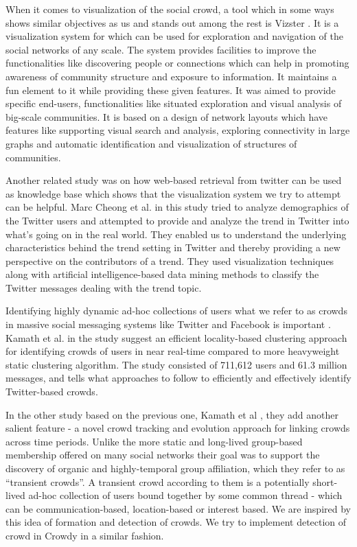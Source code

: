 \documentclass{sig-alternate}
\begin{document}
When it comes to visualization of the social crowd, a tool which in some ways
shows similar objectives as us and stands out among the rest is Vizster
\cite{Heer:2005}. It is a visualization system for which can be used for
exploration and navigation of the social networks of any scale. The system
provides facilities to improve the functionalities like discovering people or
connections which can help in promoting awareness of community structure and
exposure to information. It maintains a fun element to it while providing these
given features. It was aimed to provide specific end-users, functionalities
like situated exploration and visual analysis of big-scale communities. It is
based on a design of network layouts which have features like supporting visual
search and analysis, exploring connectivity in large graphs and automatic
identification and visualization of structures of communities.

Another related study was on how web-based retrieval from twitter can be used
as knowledge base \cite{Cheong:2009} which shows that the visualization system
we try to attempt can be helpful. Marc Cheong et al. in this study tried to
analyze demographics of the Twitter users and attempted to provide and analyze
the trend in Twitter into what's going on in the real world. They enabled us to
understand the underlying characteristics behind the trend setting in Twitter
and thereby providing a new perspective on the contributors of a trend. They
used visualization techniques along with artificial intelligence-based data
mining methods to classify the Twitter messages dealing with the trend topic.

Identifying highly dynamic ad-hoc collections of users what we refer to as
crowds in massive social messaging systems like Twitter and Facebook is
important \cite{krishna:2010}. Kamath et al. in the study suggest an
efficient locality-based clustering approach for identifying crowds of users in
near real-time compared to more heavyweight static clustering algorithm. The
study consisted of 711,612 users and 61.3 million messages, and tells what
approaches to follow to efficiently and effectively identify Twitter-based
crowds.

In the other study based on the previous one, Kamath et al
\cite{krishna:2011}, they add another salient feature - a novel crowd tracking
and evolution approach for linking crowds across time periods. Unlike the more
static and long-lived group-based membership offered on many social networks
their goal was to support the discovery of organic and highly-temporal group
affiliation, which they refer to as ``transient crowds''. A transient crowd
according to them is a potentially short-lived ad-hoc collection of users bound
together by some common thread - which can be communication-based,
location-based or interest based. We are inspired by this idea of formation and
detection of crowds. We try to implement detection of crowd in Crowdy in a
similar fashion.
\end{document}
